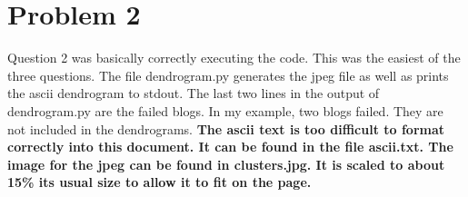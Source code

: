 \documentclass[11pt]{report}
\begin{document}
\section{Problem 2}
Question 2 was basically correctly executing the code. This was the easiest of the three questions. The file dendrogram.py generates the jpeg file as well as prints the ascii dendrogram to stdout. The last two lines in the output of dendrogram.py are the failed blogs. In my example, two blogs failed. They are not included in the dendrograms. \textbf{The ascii text is too difficult to format correctly into this document. It can be found in the file ascii.txt. The image for the jpeg can be found in clusters.jpg. It is scaled to about 15\% its usual size to allow it to fit on the page.}


\end{document}
